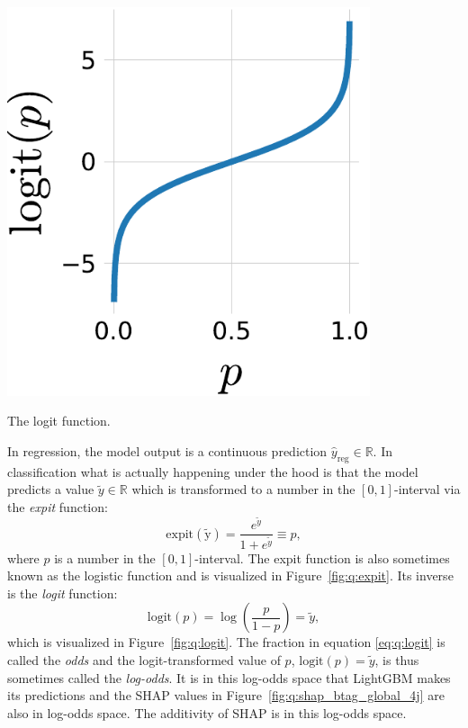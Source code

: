 \begin{marginfigure}
  \centerfloat
  \includegraphics[width=0.8\textwidth]{figures/logit_expit/logit.pdf}
  \caption[The logit Function]
          {The logit function.} 
  \label{fig:q:logit}
\end{marginfigure}

In regression, the model output is a continuous prediction ${\hat{y}_\mathrm{reg} \in \mathbb{R}}$. In classification what is actually happening under the hood is that the model predicts a value $\tilde{y} \in \mathbb{R}$ which is transformed to a number in the $[0, 1]$-interval via the \emph{expit} function:
\begin{equation}
    \label{eq:q:expit}
    \mathrm{expit(\tilde{y})} = \frac{e^{\tilde{y}}}{1+e^{\tilde{y}}} \equiv p,
\end{equation}
where $p$ is a number in the $[0, 1]$-interval. The expit function is also sometimes known as the logistic function and is visualized in Figure~\ref{fig:q:expit}. Its inverse is the \emph{logit} function:
\begin{equation}
  \label{eq:q:logit}
  \mathrm{logit}(p) = \log \left( \frac{p}{1-p}  \right) = \tilde{y},
\end{equation}
 which is visualized in Figure~\ref{fig:q:logit}. The fraction in equation \eqref{eq:q:logit} is called the \emph{odds} and the logit-transformed value of $p$, $\mathrm{logit}(p)=\tilde{y}$, is thus sometimes called the \emph{log-odds}. It is in this log-odds space that LightGBM makes its predictions and the SHAP values in Figure~\ref{fig:q:shap_btag_global_4j} are also in log-odds space. The additivity of SHAP is in this log-odds space. 


